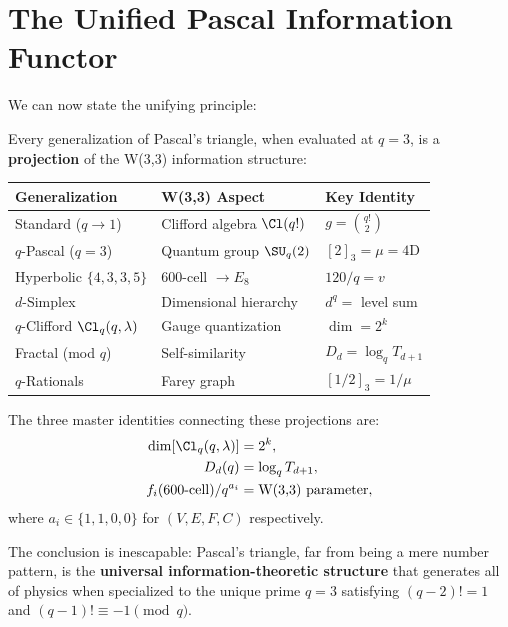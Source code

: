 \section{The Unified Pascal Information Functor}
\label{sec:pascal-functor}

We can now state the unifying principle:

\begin{theorem}
\label{thm:pascal-functor}
Every generalization of Pascal's triangle, when evaluated at $q=3$,
is a \textbf{projection} of the W(3,3) information structure:
\begin{center}
\renewcommand{\arraystretch}{1.3}
\begin{tabular}{@{}lll@{}}
\toprule
\textbf{Generalization} & \textbf{W(3,3) Aspect} & \textbf{Key Identity} \\
\midrule
Standard ($q\to 1$) & Clifford algebra $\Cl(q!)$ & $g = \binom{q!}{2}$ \\
$q$-Pascal ($q=3$) & Quantum group $\SU_q(2)$ & $[2]_3 = \mu = 4\mathrm{D}$ \\
Hyperbolic $\{4,3,3,5\}$ & 600-cell $\to E_8$ & $120/q = v$ \\
$d$-Simplex & Dimensional hierarchy & $d^q = $ level sum \\
$q$-Clifford $\Cl_q(q,\lambda)$ & Gauge quantization & $\dim = 2^k$ \\
Fractal (mod $q$) & Self-similarity & $D_d = \log_q T_{d+1}$ \\
$q$-Rationals & Farey graph & $[1/2]_3 = 1/\mu$ \\
\bottomrule
\end{tabular}
\end{center}
The three master identities connecting these projections are:
\begin{align}
\dim[\Cl_q(q,\lambda)] &= 2^k, \label{eq:master1} \\
D_d(q) &= \log_q T_{d+1}, \label{eq:master2} \\
f_i(\text{600-cell}) / q^{a_i} &= \text{W(3,3) parameter}, \label{eq:master3}
\end{align}
where $a_i \in \{1, 1, 0, 0\}$ for $(V,E,F,C)$ respectively.
\end{theorem}

The conclusion is inescapable: Pascal's triangle, far from being
a mere number pattern, is the \textbf{universal information-theoretic
structure} that generates all of physics when specialized to the
unique prime $q=3$ satisfying $(q{-}2)!=1$ and $(q{-}1)!\equiv -1\pmod{q}$.
